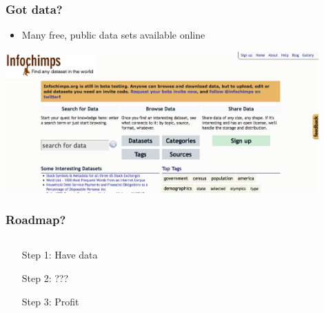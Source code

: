 \documentclass[xcolor=dvipsnames, 9pt]{beamer}
\begin{document}
\begin{frame}
  \frametitle{Got data?}

  \begin{itemize}
    \item Many free, public data sets available online
  \end{itemize}

    \begin{center}
      \includegraphics[width=0.9\textwidth]{infochimps.png}
    \end{center}

\end{frame}

\begin{frame}
  \frametitle{Roadmap?}

  \begin{columns}



    \begin{center}
      \Huge
      \begin{enumerate}
        \item[Step 1:] Have data
        \item[Step 2:] \alert{???}
        \item[Step 3:] Profit
      \end{enumerate}
    \end{center}


  \end{columns}

\end{frame}
\end{document}
